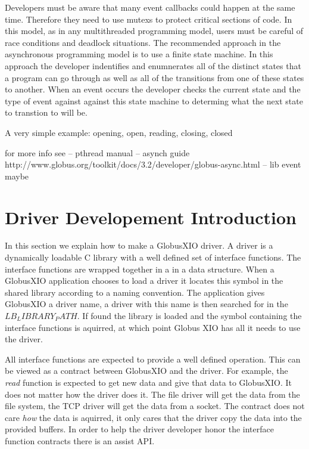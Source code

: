 \documentclass[11pt]{article}
\begin{document}
Developers must be aware that many event callbacks could happen at the same
time.  Therefore they need to use mutexs to protect critical sections
of code.  In this model, as in any multithreaded programming model,
users must be careful of race conditions and deadlock situations.
The recommended approach in the asynchronous programming model is 
to use a finite state machine.  In this approach the developer 
indentifies and enumnerates all of the distinct states that a program 
can go through as well as all of the transitions from one of these
states to another.  When an event occurs the developer checks the current
state and the type of event against against this state machine to determing
what the next state to transtion to will be.

A very simple example:  opening, open, reading, closing, closed

for more info see
-- pthread manual
-- asynch guide
    http://www.globus.org/toolkit/docs/3.2/developer/globus-async.html
-- lib event maybe


\section{Driver Developement Introduction}
In this section we explain how to make a GlobusXIO driver.  A driver is 
a dynamically loadable C library with a well defined set of interface
functions.  
The interface functions are wrapped together in a in a data structure.
When a GlobusXIO application chooses to load a driver it locates this
symbol in the shared library according to a naming convention.
The application gives GlobusXIO a driver name, a driver with this name
is then searched for in the $LB_LIBRARY_PATH$.  If found the library is
loaded and the symbol containing the interface functions is aquirred,
at which point Globus XIO has all it needs to use the driver.

All interface functions are expected to provide a well defined operation.
This can be viewed as a contract between GlobusXIO and the driver.
For example, the \emph{read} function is expected to get new data
and give that data to GlobusXIO.  It does not matter how the driver
does it.  The file driver will get the data from the file system, the
TCP driver will get the data from a socket.  The contract does not
care \emph{how} the data is aquirred, it only cares that the driver
copy the data into the provided buffers.  In order to help the driver 
developer honor the interface function contracts
there is an assist API.  
\end{document}
